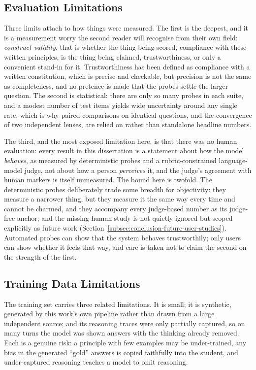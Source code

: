 \subsection{Evaluation Limitations}
\label{subsec:evaluation-limitations}

Three limits attach to how things were measured. The first is the deepest, and it is a measurement worry the second reader will recognise from their own field: \emph{construct validity}, that is whether the thing being scored, compliance with these written principles, is the thing being claimed, trustworthiness, or only a convenient stand-in for it. Trustworthiness has been defined as compliance with a written constitution, which is precise and checkable, but precision is not the same as completeness, and no pretence is made that the probes settle the larger question. The second is statistical: there are only so many probes in each suite, and a modest number of test items yields wide uncertainty around any single rate, which is why paired comparisons on identical questions, and the convergence of two independent lenses, are relied on rather than standalone headline numbers.

The third, and the most exposed limitation here, is that there was no human evaluation: every result in this dissertation is a statement about how the model \emph{behaves}, as measured by deterministic probes and a rubric-constrained language-model judge, not about how a person \emph{perceives} it, and the judge's agreement with human markers is itself unmeasured. The bound here is twofold. The deterministic probes deliberately trade some breadth for objectivity: they measure a narrower thing, but they measure it the same way every time and cannot be charmed, and they accompany every judge-based number as its judge-free anchor; and the missing human study is not quietly ignored but scoped explicitly as future work (Section~\ref{subsec:conclusion-future-user-studies}). Automated probes can show that the system behaves trustworthily; only users can show whether it feels that way, and care is taken not to claim the second on the strength of the first.

\subsection{Training Data Limitations}
\label{subsec:training-data-limitations}

The training set carries three related limitations. It is small; it is synthetic, generated by this work's own pipeline rather than drawn from a large independent source; and its reasoning traces were only partially captured, so on many turns the model was shown answers with the thinking already removed. Each is a genuine risk: a principle with few examples may be under-trained, any bias in the generated ``gold'' answers is copied faithfully into the student, and under-captured reasoning teaches a model to omit reasoning.

